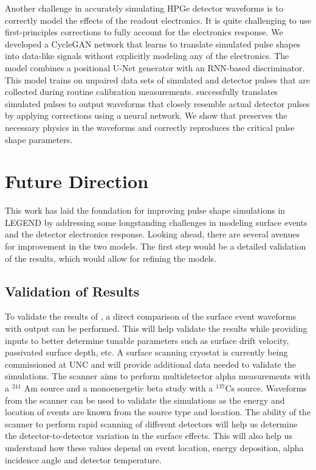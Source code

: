 Another challenge in accurately simulating HPGe detector waveforms is to correctly model the effects of the readout electronics. It is quite challenging to use first-principles corrections to fully account for the electronics response. We developed a CycleGAN network that learns to translate simulated pulse shapes into data-like signals without explicitly modeling any of the electronics. The model combines a positional U-Net generator with an RNN-based discriminator. This model trains on unpaired data sets of simulated and detector pulses that are collected during routine calibration measurements. {\cpunet} successfully translates simulated pulses to output waveforms that closely resemble actual detector pulses by applying corrections using a neural network.  We show that {\cpunet} preserves the necessary physics in the waveforms and correctly reproduces the critical pulse shape parameters.

\section{Future Direction}
This work has laid the foundation for improving pulse shape simulations in LEGEND by addressing some longstanding challenges in modeling surface events and the detector electronics response. Looking ahead, there are several avenues for improvement in the two models. The first step would be a detailed validation of the results, which would allow for refining the models.

\subsection{Validation of Results}
To validate the results of {\ehd}, a direct comparison of the surface event waveforms with {\ehd} output can be performed. This will help validate the results while providing inputs to better determine tunable parameters such as surface drift velocity, passivated surface depth, etc. A surface scanning cryostat is currently being commissioned at UNC and will provide additional data needed to validate the simulations. The scanner aims to perform multidetector alpha measurements with a $^{241}$ Am source and a monoenergetic beta study with a $^{137}$Cs source. Waveforms from the scanner can be used to validate the simulations as the energy and location of events are known from the source type and location. The ability of the scanner to perform rapid scanning of different detectors will help us determine the detector-to-detector variation in the surface effects. This will also help us understand how these values depend on event location, energy deposition, alpha incidence angle and detector temperature.

